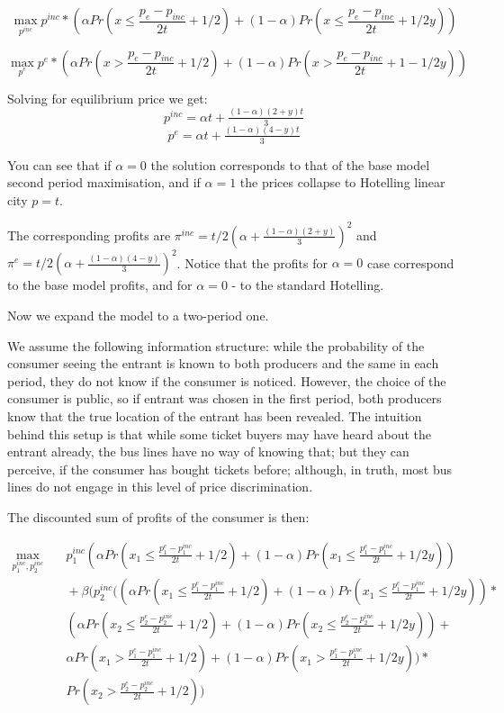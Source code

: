 \documentclass{article}
\begin{document}
$$\max_{p^{inc}} p^{inc}* (\alpha Pr(x \leq \frac{p_{e}-p_{inc}}{2t} + 1/2) + (1-\alpha)Pr(x \leq \frac{p_{e}-p_{inc}}{2t} + 1/2y))$$

$$\max_{p^{e}} p^{e}* (\alpha Pr(x > \frac{p_{e}-p_{inc}}{2t} + 1/2) + (1-\alpha)Pr(x > \frac{p_{e}-p_{inc}}{2t} + 1 - 1/2y))$$

Solving for equilibrium price we get:
$$p^{inc} = \alpha t + \tfrac{(1-\alpha)(2+y)t}{3}$$
$$p^{e} = \alpha t + \tfrac{(1-\alpha)(4-y)t}{3}$$

You can see that if $\alpha = 0$ the solution corresponds to that of the base model second period maximisation, and if $\alpha = 1$ the prices collapse to Hotelling linear city $p=t$.

The corresponding profits are $\pi^{inc} = t/2(\alpha + \tfrac{(1-\alpha)(2+y)}{3})^2$ and $\pi^{e} = t/2(\alpha + \tfrac{(1-\alpha)(4-y)}{3})^2$. Notice that the profits for $\alpha=0$ case correspond to the base model profits, and for $\alpha=0$ - to the standard Hotelling.

Now we expand the model to a two-period one.

We assume the following information structure: while the probability of the consumer seeing the entrant is known to both producers and the same in each period, they do not know if the consumer is noticed. However, the choice of the consumer is public, so if entrant was chosen in the first period, both producers know that the true location of the entrant has been revealed. The intuition behind this setup is that while some ticket buyers may have heard about the entrant already, the bus lines have no way of knowing that; but they can perceive, if the consumer has bought tickets before; although, in truth, most bus lines do not engage in this level of price discrimination.

The discounted sum of profits of the consumer is then:

 $$ \begin{aligned}
    \max_{p^{inc}_1, p^{inc}_2} {}
    & \quad p^{inc}_1(\alpha Pr(x_1 \leq \frac{p^{e}_1-p^{inc}_1}{2t} + 1/2) + (1-\alpha)Pr(x_1 \leq \frac{p^{e}_1-p^{inc}_1}{2t} + 1/2y)) \\
    & \quad + \beta(p^{inc}_2((\alpha Pr(x_1 \leq \frac{p^{e}_1-p^{inc}_1}{2t} + 1/2) + (1-\alpha)Pr(x_1 \leq \frac{p^{e}_1-p^{inc}_1}{2t} + 1/2y))* \\
    & \quad (\alpha Pr(x_2 \leq \frac{p^{e}_2-p^{inc}_2}{2t} + 1/2) + (1-\alpha)Pr(x_2 \leq \frac{p^{e}_2-p^{inc}_2}{2t} + 1/2y)) +\\
    & \quad \alpha Pr(x_1 > \frac{p^{e}_1-p^{inc}_1}{2t} + 1/2) + (1-\alpha)Pr(x_1 > \frac{p^{e}_1-p^{inc}_1}{2t} + 1/2y))*\\
    & \quad Pr(x_2 > \frac{p^{e}_2-p^{inc}_2}{2t} + 1/2))
    \end{aligned}
    $$
\end{document}
